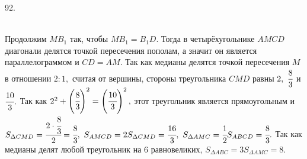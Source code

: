 92. \begin{figure}[ht!]
\end{figure}\\
Продолжим $MB_1$ так, чтобы $MB_1=B_1D.$ Тогда в четырёхугольнике $AMCD$ диагонали делятся точкой пересечения пополам, а значит он является параллелограммом и $CD=AM.$ Так как медианы делятся точкой пересечения $M$ в отношении $2:1,$ считая от вершины, стороны треугольника $CMD$ равны $2,\ \cfrac{8}{3}$ и $\cfrac{10}{3}.$ Так как $2^2+\left(\cfrac{8}{3}\right)^2=\left(\cfrac{10}{3}\right)^2,$ этот треугольник является прямоугольным и  $S_{\Delta CMD}=\cfrac{2\cdot\cfrac{8}{3}}{2}=\cfrac{8}{3},\ S_{AMCD}=2S_{\Delta CMD}=\cfrac{16}{3},\ S_{\Delta AMC}=\cfrac{1}{2}S_{ABCD}=\cfrac{8}{3}.$ Так как медианы делят любой треугольник на 6 равновеликих, $S_{\Delta ABC}=3S_{\Delta AMC}=8.$\\

